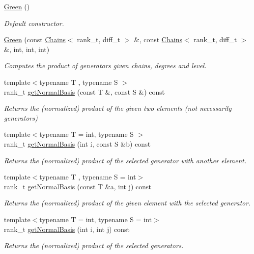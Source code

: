 \begin{DoxyCompactItemize}
\item 
\hyperlink{classMackey_1_1Green_ad3bb0ba97c91a5db4fcf57687a571915}{Green} ()
\begin{DoxyCompactList}\small\item\em Default constructor. \end{DoxyCompactList}\item 
\hyperlink{classMackey_1_1Green_a614ae228cc8c5cccddcf562923f06f3a}{Green} (const \hyperlink{classMackey_1_1Chains}{Chains}$<$ rank\+\_\+t, diff\+\_\+t $>$ \&, const \hyperlink{classMackey_1_1Chains}{Chains}$<$ rank\+\_\+t, diff\+\_\+t $>$ \&, int, int, int)
\begin{DoxyCompactList}\small\item\em Computes the product of generators given chains, degrees and level. \end{DoxyCompactList}\item 
{\footnotesize template$<$typename T , typename S $>$ }\\rank\+\_\+t \hyperlink{classMackey_1_1Green_a35594da87192177ce4bb623ad1b30c84}{get\+Normal\+Basis} (const T \&, const S \&) const
\begin{DoxyCompactList}\small\item\em Returns the (normalized) product of the given two elements (not necessarily generators) \end{DoxyCompactList}\item 
{\footnotesize template$<$typename T  = int, typename S $>$ }\\rank\+\_\+t \hyperlink{classMackey_1_1Green_a257e9f34318b5e2dbbe668b4e237a6c3}{get\+Normal\+Basis} (int i, const S \&b) const
\begin{DoxyCompactList}\small\item\em Returns the (normalized) product of the selected generator with another element. \end{DoxyCompactList}\item 
{\footnotesize template$<$typename T , typename S  = int$>$ }\\rank\+\_\+t \hyperlink{classMackey_1_1Green_a7e2d97abb22044ec3abbe91bc9c33ee9}{get\+Normal\+Basis} (const T \&a, int j) const
\begin{DoxyCompactList}\small\item\em Returns the (normalized) product of the given element with the selected generator. \end{DoxyCompactList}\item 
{\footnotesize template$<$typename T  = int, typename S  = int$>$ }\\rank\+\_\+t \hyperlink{classMackey_1_1Green_a3f7f1f3a020f23a00fae372956f50827}{get\+Normal\+Basis} (int i, int j) const
\begin{DoxyCompactList}\small\item\em Returns the (normalized) product of the selected generators. \end{DoxyCompactList}\end{DoxyCompactItemize}
